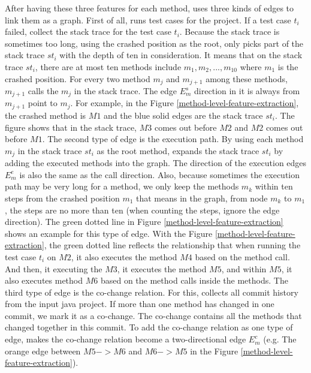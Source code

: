After having these three features for each method, \tool uses three kinds of edges to link them as a graph. First of all, \tool runs test cases for the project. If a test case $t_i$ failed, \tool collect the stack trace for the test case $t_i$. Because the stack trace is sometimes too long, using the crashed position as the root, \tool only picks part of the stack trace $st_i$ with the depth of ten in consideration. It means that on the stack trace $st_i$, there are at most ten methods include $m_1, m_2, ..., m_{10}$ where $m_1$ is the crashed position. For every two method $m_j$ and $m_{j+1}$ among these methods, $m_{j+1}$ calls the $m_j$ in the stack trace. The edge $E_m^s$ direction in it is always from $m_{j+1}$ point to $m_j$. For example, in the Figure \ref{method-level-feature-extraction}, the crashed method is $M1$ and the blue solid edges are the stack trace $st_i$. The figure shows that in the stack trace, $M3$ comes out before $M2$ and $M2$ comes out before $M1$. The second type of edge is the execution path. By using each method $m_j$ in the stack trace $st_i$ as the root method, \tool expands the stack trace $st_i$ by adding the executed methods into the graph. The direction of the execution edges $E_m^e$ is also the same as the call direction. Also, because sometimes the execution path may be very long for a method, we only keep the methods $m_k$ within ten steps from the crashed position $m_1$ that means in the graph, from node $m_k$ to $m_1$, the steps are no more than ten (when counting the steps, \tool ignore the edge direction). The green dotted line in Figure \ref{method-level-feature-extraction} shows an example for this type of edge. With the Figure \ref{method-level-feature-extraction}, the green dotted line reflects the relationship that when running the test case $t_i$ on $M2$, it also executes the method $M4$ based on the method call. And then, it executing the $M3$, it executes the method $M5$, and within $M5$, it also executes method $M6$ based on the method calls inside the methods. The third type of edge is the co-change relation. For this,  \tool collects all commit history from the input java project. If more than one method has changed in one commit, we mark it as a co-change. The co-change contains all the methods that changed together in this commit. To add the co-change relation as one type of edge, \tool makes the co-change relation become a two-directional edge $E_m^c$ (e.g. The orange edge between $M5->M6$ and $M6->M5$ in the Figure \ref{method-level-feature-extraction}).
%
